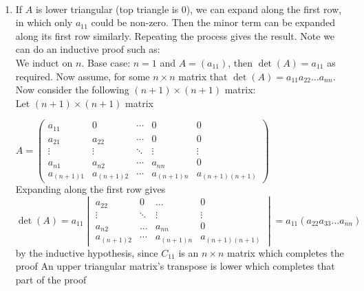 \documentclass{report}
\begin{document}
\begin{myproof}
    ~\\
    \begin{enumerate}
        \item If $A$ is lower triangular (top triangle is 0), we can expand along the first row, in which only  $a_{11}$ could be non-zero. Then the minor term can be expanded along its first row similarly. Repeating the process gives the result. Note we can do an inductive proof such as: \\
            We induct on $n$. Base case:  $n=1$ and  $A = (a_{11})$, then $\det (A) = a_{11}$ as required. Now assume, for some $n \times n$ matrix that $\det (A) = a_{11}a_{22}\ldots a_{nn}$. Now consider the following $(n+1) \times (n+1)$ matrix: \\
            Let   $(n+1) \times (n+1)$  matrix

            $ A  =
            \begin{pmatrix}
                a_{11}  & 0  & \cdots  & 0  & 0 \\
                a_{21}  & a_{22}  & \cdots  & 0  &  0 \\
                \vdots & \vdots & \ddots & \vdots  & \vdots \\
            a_{n1}  & a_{n2}  & \cdots & a_{nn}  & 0 \\
            a_{(n+1)1}  & a_{(n+1)2}  & \cdots  & a_{(n+1)n}  & a_{(n+1)(n+1)} 
            \end{pmatrix} $ \\ Expanding along the first row gives $\det (A) = a_{11} \begin{vmatrix}
            a_{22}  & 0 & \ldots & 0 \\ \vdots  &  \ddots  & \vdots  & \vdots \\ a_{n2}  & \ldots  &  a_{nn}  & 0 \\   a_{(n+1)2}  & \cdots  & a_{(n+1)n}  & a_{(n+1)(n+1)}
        \end{vmatrix} = a_{11}(a_{22}a_{33}\ldots a_{nn}) $ by the inductive hypothesis, since $C_{11}$ is an $n \times n$ matrix which completes the proof 
        An upper triangular matrix's transpose is lower which completes that part of the proof


\end{enumerate}
\end{myproof}
\end{document}
